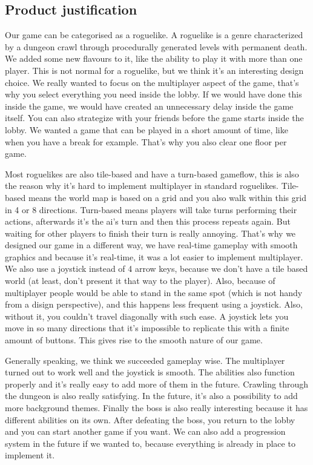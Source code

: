 \documentclass[../main.tex]{subfiles}
\begin{document}
	\subsection{Product justification}
	Our game can be categorised as a roguelike. A roguelike is a genre characterized by a dungeon crawl through procedurally generated levels with permanent death. We added some new flavours to it, like the ability to play it with more than one player. This is not normal for a roguelike, but we think it’s an interesting design choice. We really wanted to focus on the multiplayer aspect of the game, that’s why you select everything you need inside the lobby. If we would have done this inside the game, we would have created an unnecessary delay inside the game itself. You can also strategize with your friends before the game starts inside the lobby. We wanted a game that can be played in a short amount of time, like when you have a break for example. That’s why you also clear one floor per game. 
	
Most roguelikes are also tile-based and have a turn-based gameflow, this is also the reason why it’s hard to implement multiplayer in standard roguelikes. Tile-based means the world map is based on a grid and you also walk within this grid in 4 or 8 directions. Turn-based means players will take turns performing their actions, afterwards it’s the ai’s turn and then this process repeats again. But waiting for other players to finish their turn is really annoying. That’s why we designed our game in a different way, we have real-time gameplay with smooth graphics and because it’s real-time, it was a lot easier to implement multiplayer. We also use a joystick instead of 4 arrow keys, because we don’t have a tile based world (at least, don't present it that way to the player). Also, because of multiplayer people would be able to stand in the same spot (which is not handy from a disign perspective), and this happens less frequent using a joystick. Also, without it, you couldn’t travel diagonally with such ease. A joystick lets you move in so many directions that it’s impossible to replicate this with a finite amount of buttons. This gives rise to the smooth nature of our game.

    Generally speaking, we think we succeeded gameplay wise. The multiplayer turned out to work well and the joystick is smooth. The abilities also function properly and it’s really easy to add more of them in the future. Crawling through the dungeon is also really satisfying. In the future, it’s also a possibility to add more background themes. Finally the boss is also really interesting because it has different abilities on its own. After defeating the boss, you return to the lobby and you can start another game if you want. We can also add a progression system in the future if we wanted to, because everything is already in place to implement it.
\end{document}
